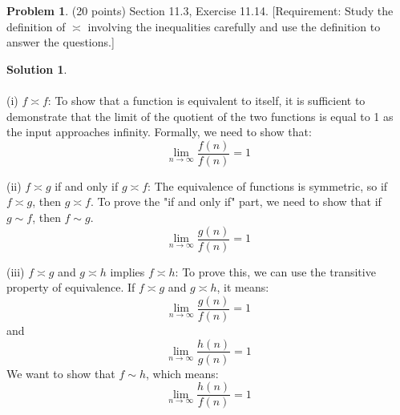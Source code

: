 \documentclass{article}
\theoremstyle{definition}
\newtheorem{problem}{Problem}
\newtheorem*{solution}{Solution}
\begin{document}
\newpage
\begin{problem} (20 points) Section 11.3, Exercise 11.14.
[Requirement: Study the definition of $\asymp$ involving the inequalities carefully 
and use the definition to answer the questions.] 
\end{problem}
\begin{solution}
~\\
~\\  
(i) $f \asymp f$:
To show that a function is equivalent to itself, it is sufficient to demonstrate that the limit of the quotient of the two functions is equal to 1 as the input approaches infinity. Formally, we need to show that:
\[
\lim_{{n \to \infty}} \frac{{f(n)}}{{f(n)}} = 1
\]

(ii) $f \asymp g$ if and only if $g \asymp f$:
The equivalence of functions is symmetric, so if $f \asymp g$, then $g \asymp f$. To prove the "if and only if" part, we need to show that if $g \sim f$, then $f \sim g$.
\[
\lim_{{n \to \infty}} \frac{{g(n)}}{{f(n)}} = 1
\]

(iii) $f \asymp g$ and $g \asymp h$ implies $f \asymp h$:
To prove this, we can use the transitive property of equivalence. If $f \asymp g$ and $g \asymp h$, it means:
\[
\lim_{{n \to \infty}} \frac{{g(n)}}{{f(n)}} = 1
\]
and
\[
\lim_{{n \to \infty}} \frac{{h(n)}}{{g(n)}} = 1
\]
We want to show that $f \sim h$, which means:
\[
\lim_{{n \to \infty}} \frac{{h(n)}}{{f(n)}} = 1
\]
\end{solution}
\end{document}
